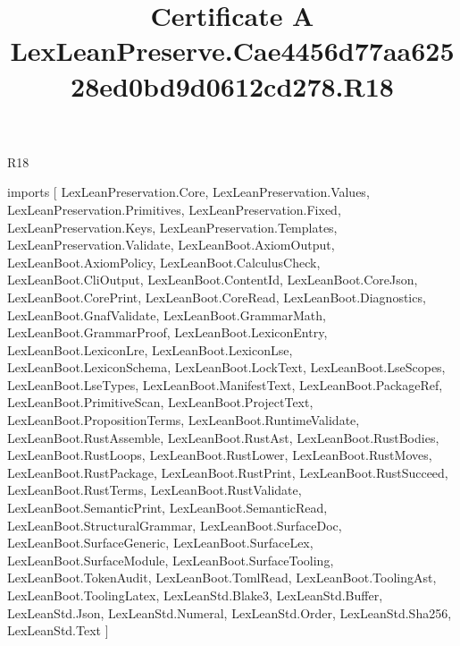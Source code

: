 \begin{lexlean}{R18}
\title{Certificate A LexLeanPreserve.Cae4456d77aa62528ed0bd9d0612cd278.R18}
\begin{coremodule}
imports [
  LexLeanPreservation.Core,
  LexLeanPreservation.Values,
  LexLeanPreservation.Primitives,
  LexLeanPreservation.Fixed,
  LexLeanPreservation.Keys,
  LexLeanPreservation.Templates,
  LexLeanPreservation.Validate,
  LexLeanBoot.AxiomOutput,
  LexLeanBoot.AxiomPolicy,
  LexLeanBoot.CalculusCheck,
  LexLeanBoot.CliOutput,
  LexLeanBoot.ContentId,
  LexLeanBoot.CoreJson,
  LexLeanBoot.CorePrint,
  LexLeanBoot.CoreRead,
  LexLeanBoot.Diagnostics,
  LexLeanBoot.GnafValidate,
  LexLeanBoot.GrammarMath,
  LexLeanBoot.GrammarProof,
  LexLeanBoot.LexiconEntry,
  LexLeanBoot.LexiconLre,
  LexLeanBoot.LexiconLse,
  LexLeanBoot.LexiconSchema,
  LexLeanBoot.LockText,
  LexLeanBoot.LseScopes,
  LexLeanBoot.LseTypes,
  LexLeanBoot.ManifestText,
  LexLeanBoot.PackageRef,
  LexLeanBoot.PrimitiveScan,
  LexLeanBoot.ProjectText,
  LexLeanBoot.PropositionTerms,
  LexLeanBoot.RuntimeValidate,
  LexLeanBoot.RustAssemble,
  LexLeanBoot.RustAst,
  LexLeanBoot.RustBodies,
  LexLeanBoot.RustLoops,
  LexLeanBoot.RustLower,
  LexLeanBoot.RustMoves,
  LexLeanBoot.RustPackage,
  LexLeanBoot.RustPrint,
  LexLeanBoot.RustSucceed,
  LexLeanBoot.RustTerms,
  LexLeanBoot.RustValidate,
  LexLeanBoot.SemanticPrint,
  LexLeanBoot.SemanticRead,
  LexLeanBoot.StructuralGrammar,
  LexLeanBoot.SurfaceDoc,
  LexLeanBoot.SurfaceGeneric,
  LexLeanBoot.SurfaceLex,
  LexLeanBoot.SurfaceModule,
  LexLeanBoot.SurfaceTooling,
  LexLeanBoot.TokenAudit,
  LexLeanBoot.TomlRead,
  LexLeanBoot.ToolingAst,
  LexLeanBoot.ToolingLatex,
  LexLeanStd.Blake3,
  LexLeanStd.Buffer,
  LexLeanStd.Json,
  LexLeanStd.Numeral,
  LexLeanStd.Order,
  LexLeanStd.Sha256,
  LexLeanStd.Text
]


\end{coremodule}
\end{lexlean}
